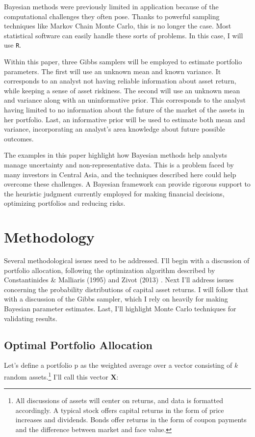 \documentclass[a4paper]{article}\usepackage[]{graphicx}\usepackage[]{color}
\begin{document}
Bayesian methods were previously limited in application because of the computational challenges they often pose. Thanks to powerful sampling techniques like Markov Chain Monte Carlo, this is no longer the case. Most statistical software can easily handle these sorts of problems. In this case, I will use \texttt{R}.

Within this paper, three Gibbs samplers will be employed to estimate portfolio parameters. The first will use an unknown mean and known variance. It corresponds to an analyst not having reliable information about asset return, while keeping a sense of asset riskiness. The second will use an unknown mean and variance along with an uninformative prior. This corresponds to the analyst having limited to no information about the future of the market of the assets in her portfolio. Last, an informative prior will be used to estimate both mean and variance, incorporating an analyst's area knowledge about future possible outcomes.

The examples in this paper highlight how Bayesian methods help analysts manage uncertainty and non-representative data. This is a problem faced by many investors in Central Asia, and the techniques described here could help overcome these challenges. A Bayesian framework can provide rigorous support to the heuristic judgment currently employed for making financial decisions, optimizing portfolios and reducing risks.


\section{Methodology}

Several methodological issues need to be addressed. I'll begin with a discussion of portfolio allocation, following the optimization algorithm described by Constantinides \& Malliaris (1995) \cite{const95} and Zivot (2013) \cite{zivot13}. Next I'll address issues concerning the probability distributions of capital asset returns. I will follow that with a discussion of the Gibbs sampler, which I rely on heavily for making Bayesian parameter estimates. Last, I'll highlight Monte Carlo techniques for validating results.

\subsection{Optimal Portfolio Allocation}

Let’s define a portfolio p as the weighted average over a vector consisting of $k$ random assets.\footnote{All discussions of assets will center on returns, and data is formatted accordingly. A typical stock offers capital returns in the form of price increases and dividends. Bonds offer returns in the form of coupon payments and the difference between market and face value.} I’ll call this vector $\bm{X}$:
\end{document}
